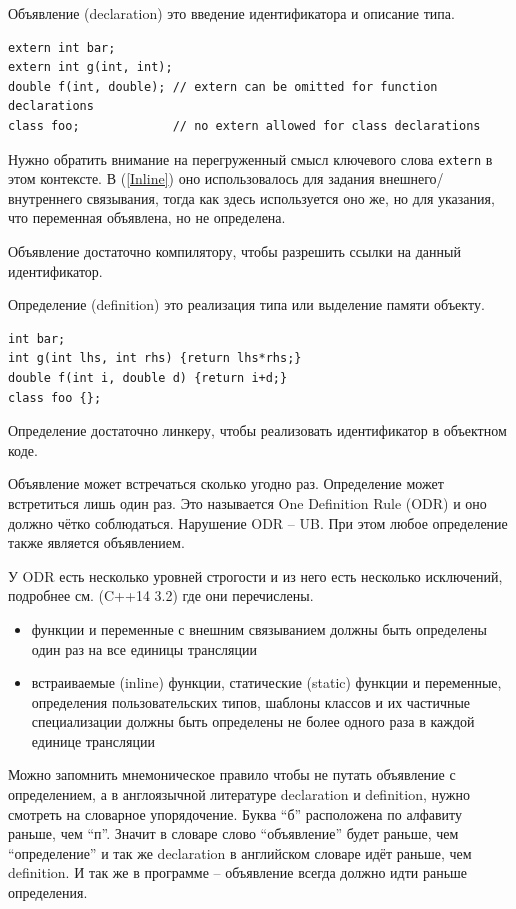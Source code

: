 \documentclass[a4paper,12pt,oneside]{book}
\begin{document}
Объявление (declaration) это введение идентификатора и описание типа.

\begin{lstlisting}
extern int bar;
extern int g(int, int);
double f(int, double); // extern can be omitted for function declarations
class foo;             // no extern allowed for class declarations
\end{lstlisting}

Нужно обратить внимание на перегруженный смысл ключевого слова \lstinline!extern! в этом контексте. В (\ref{Inline}) оно использовалось для задания внешнего/внутреннего связывания, тогда как здесь используется оно же, но для указания, что переменная объявлена, но не определена.

Объявление достаточно компилятору, чтобы разрешить ссылки на данный идентификатор. 

Определение (definition) это реализация типа или выделение памяти объекту.

\begin{lstlisting}
int bar;
int g(int lhs, int rhs) {return lhs*rhs;}
double f(int i, double d) {return i+d;}
class foo {};
\end{lstlisting}

Определение достаточно линкеру, чтобы реализовать идентификатор в объектном коде. 

Объявление может встречаться сколько угодно раз. Определение может встретиться лишь один раз. Это называется One Definition Rule (ODR) и оно должно чётко соблюдаться. Нарушение ODR -- UB. При этом любое определение также является объявлением.

У ODR есть несколько уровней строгости и из него есть несколько исключений, подробнее см. (C++14 3.2) где они перечислены.

\begin{itemize}
\item функции и переменные с внешним связыванием должны быть определены один раз на все единицы трансляции
\item встраиваемые (inline) функции, статические (static) функции и переменные, определения пользовательских типов, шаблоны классов и их частичные специализации должны быть определены не более одного раза в каждой единице трансляции
\end{itemize}

Можно запомнить мнемоническое правило чтобы не путать объявление с определением, а в англоязычной литературе declaration и definition, нужно смотреть на словарное упорядочение.  Буква ``б'' расположена по алфавиту раньше, чем ``п''. Значит в словаре слово ``объявление'' будет раньше, чем ``определение'' и так же declaration в английском словаре идёт раньше, чем definition. И так же в программе – объявление всегда должно идти раньше определения.
\end{document}
